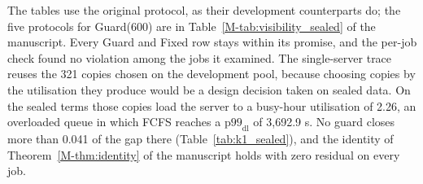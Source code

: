 \documentclass[mathematics,supfile,submit,moreauthors]{Definitions/mdpi}
\begin{document}
The tables use the original protocol, as their development counterparts do; the five
protocols for Guard(600) are in Table~\ref*{M-tab:visibility_sealed} of the manuscript.
Every Guard and Fixed row stays within its promise, and the per-job check found no
violation among the jobs it examined. The single-server trace reuses the 321 copies chosen
on the development pool, because choosing copies by the utilisation they produce would be
a design decision taken on sealed data. On the sealed terms those copies load the server to
a busy-hour utilisation of 2.26, an overloaded queue in which FCFS reaches a
$\mathrm{p99}_{\mathrm{dl}}$ of 3,692.9 s. No guard closes more than 0.041 of the gap there
(Table~\ref{tab:k1_sealed}), and the identity of Theorem~\ref*{M-thm:identity} of the
manuscript holds with zero residual on every job.
\end{document}
